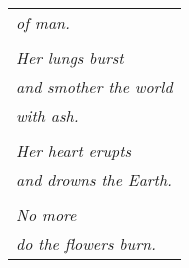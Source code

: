 \documentclass{article}
\begin{document}
\begin{center}
\begin{tabular}{l}
\textit{of man.} \\
\\
\textit{Her lungs burst} \\
\textit{and smother the world} \\
\textit{with ash.} \\
\\
\textit{Her heart erupts} \\
\textit{and drowns the Earth.} \\
\\
\textit{No more} \\
\textit{do the flowers burn.} \\
\end{tabular}
\end{center}
\end{document}
